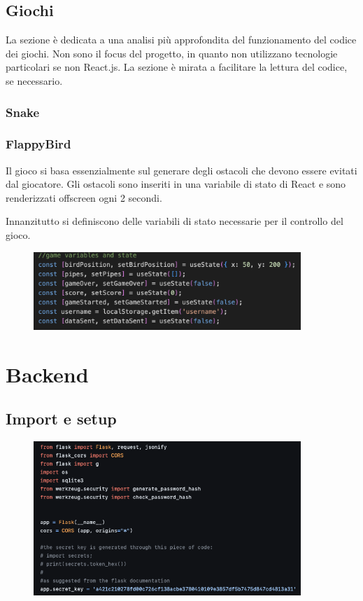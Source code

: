 \documentclass{article}
\begin{document}
\subsection{Giochi}
La sezione è dedicata a una analisi più approfondita del funzionamento del codice dei giochi.
Non sono il focus del progetto, in quanto non utilizzano tecnologie particolari se non React.js. La sezione è mirata a facilitare la lettura del codice, se necessario.


\subsubsection{Snake}

\subsubsection{FlappyBird}
Il gioco si basa essenzialmente sul generare degli ostacoli che devono essere evitati dal giocatore. 
Gli ostacoli sono inseriti in una variabile di stato di React e sono renderizzati offscreen ogni 2 secondi.

Innanzitutto si definiscono delle variabili di stato necessarie per il controllo del gioco.
\begin{figure}[H]
    \centering
    \includegraphics[width=0.9\textwidth]{images/Flappy_variables.png}
\end{figure}


\section{Backend}

\subsection{Import e setup}

\begin{figure}[H]
    \centering
    \includegraphics[width=0.9\textwidth]{images/import.png}
\end{figure}
\end{document}
